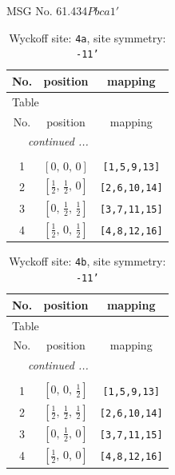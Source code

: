 \documentclass[fleqn,8pt]{jsarticle}
\begin{document}
\setcounter{MaxMatrixCols}{32}

\renewcommand{\tablename}{Table~}
\renewcommand{\figurename}{Figure~}
\begin{center}
\LARGE
MSG No. 61.434\quad$Pbca1'$
\end{center}
\renewcommand{\arraystretch}{1.2}
\begin{longtable}{ccc}
\caption{Wyckoff site: {\tt 4a}, site symmetry: {\tt -11'}}
 \\
 \hline \hline
No. & position & mapping \\ \hline \endfirsthead

\multicolumn{2}{l}{\tablename\ \thetable{}} \\
 \hline \hline
No. & position & mapping \\ \hline \endhead

 \hline \hline
\multicolumn{2}{r}{\footnotesize\it continued ...} \\ \endfoot

 \hline \hline
\multicolumn{2}{r}{} \\ \endlastfoot

1 & $\left[ 0,\, 0,\, 0 \right]$ & {\tt [1,5,9,13]} \\ \hline
2 & $\left[ \frac{1}{2},\, \frac{1}{2},\, 0 \right]$ & {\tt [2,6,10,14]} \\ \hline
3 & $\left[ 0,\, \frac{1}{2},\, \frac{1}{2} \right]$ & {\tt [3,7,11,15]} \\ \hline
4 & $\left[ \frac{1}{2},\, 0,\, \frac{1}{2} \right]$ & {\tt [4,8,12,16]} \\
\end{longtable}
\renewcommand{\arraystretch}{1.2}
\begin{longtable}{ccc}
\caption{Wyckoff site: {\tt 4b}, site symmetry: {\tt -11'}}
 \\
 \hline \hline
No. & position & mapping \\ \hline \endfirsthead

\multicolumn{2}{l}{\tablename\ \thetable{}} \\
 \hline \hline
No. & position & mapping \\ \hline \endhead

 \hline \hline
\multicolumn{2}{r}{\footnotesize\it continued ...} \\ \endfoot

 \hline \hline
\multicolumn{2}{r}{} \\ \endlastfoot

1 & $\left[ 0,\, 0,\, \frac{1}{2} \right]$ & {\tt [1,5,9,13]} \\ \hline
2 & $\left[ \frac{1}{2},\, \frac{1}{2},\, \frac{1}{2} \right]$ & {\tt [2,6,10,14]} \\ \hline
3 & $\left[ 0,\, \frac{1}{2},\, 0 \right]$ & {\tt [3,7,11,15]} \\ \hline
4 & $\left[ \frac{1}{2},\, 0,\, 0 \right]$ & {\tt [4,8,12,16]} \\
\end{longtable}
\end{document}
